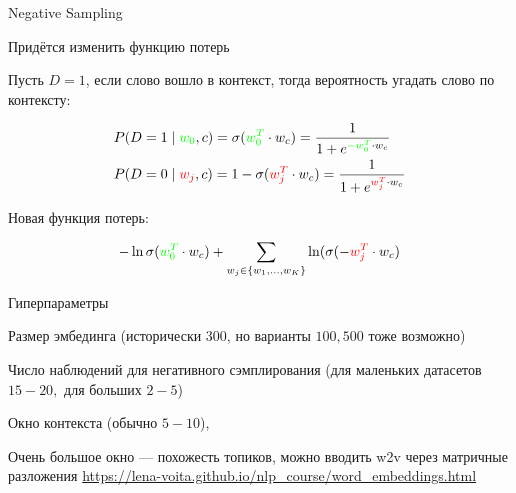 \documentclass[notes,12pt, aspectratio=169]{beamer}
\newenvironment{wideitemize}{\itemize\addtolength{\itemsep}{10pt}}{\enditemize}
\begin{document}
\begin{frame}{Negative Sampling}

\begin{wideitemize} 
	\item  Придётся изменить функцию потерь
	
	\item Пусть $D = 1$, если слово вошло в контекст, тогда вероятность угадать слово по контексту: 
	
	\begin{equation*} 
		\begin{aligned}
			&P(D = 1 \mid {\color{green} w_0}, c) = \sigma({\color{green} w_0^T} \cdot w_c) = \frac{1}{1 + e^{{\color{green} - w_0^T} \cdot w_c}}\\
			&P(D = 0 \mid {\color{red} w_j}, c) = 1 - \sigma({\color{red} w_j^T} \cdot w_c) = \frac{1}{1 + e^{{\color{red} w_j^T} \cdot w_c}}\\
		\end{aligned}
	\end{equation*}
	
	\item  Новая функция потерь: 
	
	\[
		- \ln \sigma({\color{green} w_0^T} \cdot w_c) + \sum_{w_j \in \{w_1, \ldots, w_K\}} \ln (\sigma(-{\color{red} w_j^T} \cdot w_c)
	\]
	
\end{wideitemize}
\end{frame} 


\begin{frame}{Гиперпараметры}
	\begin{wideitemize} 
		\item  Размер эмбединга (исторически $300$, но варианты $100, 500$ тоже возможно)
		
		\item  Число наблюдений для негативного сэмплирования (для маленьких датасетов $15-20,$ для больших $2-5$)
		
		\item  Окно контекста (обычно $5-10$), 
		
		\item  Очень большое окно —  похожесть топиков, можно вводить w2v через матричные разложения
	\end{wideitemize} 
\vfill
\footnotesize{\color{blue} \url{https://lena-voita.github.io/nlp_course/word_embeddings.html}}
\end{frame} 
\end{document}
